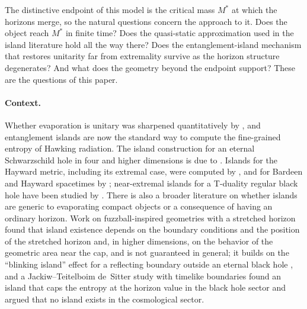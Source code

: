\documentclass[11pt]{article}
\begin{document}
The distinctive endpoint of this model is the critical mass $M^*$ at which the horizons merge, so the natural questions concern the approach to it. Does the object reach $M^*$ in finite time? Does the quasi-static approximation used in the island literature hold all the way there? Does the entanglement-island mechanism that restores unitarity far from extremality survive as the horizon structure degenerates? And what does the geometry beyond the endpoint support? These are the questions of this paper.

\paragraph{Context.}
Whether evaporation is unitary was sharpened quantitatively by \citet{Page1993}, and entanglement islands \citep{Penington2019,AMMZ2019,AHMST2020,EngelhardtWall2015} are now the standard way to compute the fine-grained entropy of Hawking radiation. The island construction for an eternal Schwarzschild hole in four and higher dimensions is due to \citet{Hashimoto2020}. Islands for the Hayward metric, including its extremal case, were computed by \citet{KimNam2021}, and for Bardeen and Hayward spacetimes by \citet{Luongo2023}; near-extremal islands for a T-duality regular black hole have been studied by \citet{Anand2026}. There is also a broader literature on whether islands are generic to evaporating compact objects or a consequence of having an ordinary horizon. Work on fuzzball-inspired geometries with a stretched horizon \citep{AgeevZueva2026} found that island existence depends on the boundary conditions and the position of the stretched horizon and, in higher dimensions, on the behavior of the geometric area near the cap, and is not guaranteed in general; it builds on the ``blinking island'' effect for a reflecting boundary outside an eternal black hole \citep{AgeevArefevaRusalev2025}, and a Jackiw--Teitelboim de~Sitter study with timelike boundaries \citep{Rusalev2025} found an island that caps the entropy at the horizon value in the black hole sector and argued that no island exists in the cosmological sector.
\end{document}
